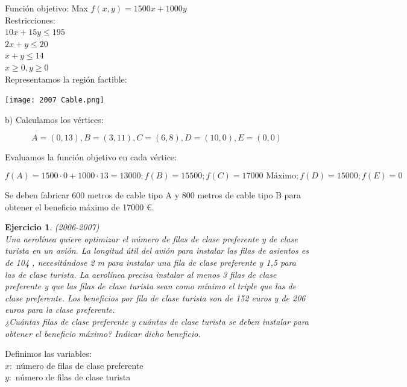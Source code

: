 \documentclass[12pt, a4paper]{amsart}
\newtheorem{ejer}{Ejercicio}
\newcommand{\s}{\color[rgb]{0,0,0.5}}
\newcommand{\n}{\color[rgb]{0,0,0}}
\begin{document}
Función objetivo: Max $f(x,y)=1500x+1000y$\\

Restricciones:\\
$10x+15y\leqslant 195$\\
$2x+y\leqslant 20$\\
$x+y\leqslant 14$\\
$x\geqslant 0, y\geqslant 0$\\

Representamos la región factible:

\begin{center}
\texttt{[image: 2007 Cable.png]}
\end{center}

b) Calculamos los vértices:

\[A=(0,13),B=(3,11), C=(6,8), D=(10,0), E=(0,0)\]

Evaluamos la función objetivo en cada vértice:

\[f(A)=1500\cdot 0+1000\cdot 13=13000; f(B)=15500; f(C)=17000 \text{ Máximo}; f(D)=15000; f(E)=0\]

\vspace*{5mm}

Se deben fabricar 600 metros de cable tipo A y 800 metros de cable tipo B para obtener el beneficio máximo de 17000 \euro.


\n

\begin{ejer}\em  (2006-2007)\\
Una aerolínea quiere optimizar el número de filas de clase preferente y de clase turista en un avión. La longitud útil del avión para instalar las filas de asientos es de 104 , necesitándose 2 m  para instalar una fila de clase preferente y 1,5   para las de clase turista. La aerolínea precisa instalar al menos 3 filas de clase preferente y que las filas de clase turista sean como mínimo el triple que las de clase preferente. Los beneficios por fila de clase turista son de 152 euros y de 206 euros para la clase preferente.\\
¿Cuántas filas de clase preferente y cuántas de clase turista se deben instalar para obtener el beneficio máximo? Indicar dicho beneficio.
\end{ejer}
\s

\hspace*{-4mm}Definimos las variables:\\
$x:$ número de filas de clase preferente\\
$y:$ número de filas de clase turista\\
\end{document}
